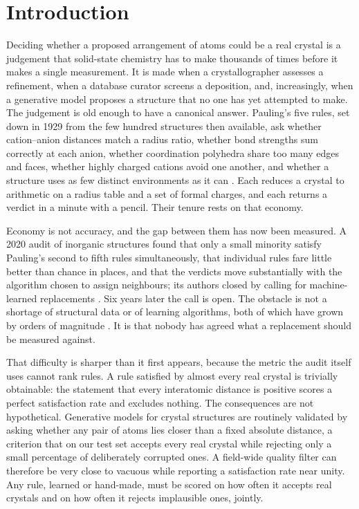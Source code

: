\section{Introduction}

Deciding whether a proposed arrangement of atoms could be a real crystal is a judgement
that solid-state chemistry has to make thousands of times before it makes a single
measurement. It is made when a crystallographer assesses a refinement, when a database
curator screens a deposition, and, increasingly, when a generative model proposes a
structure that no one has yet attempted to make. The judgement is old enough to have a
canonical answer. Pauling's five rules, set down in 1929 from the few hundred structures
then available, ask whether cation--anion distances match a radius ratio, whether bond
strengths sum correctly at each anion, whether coordination polyhedra share too many
edges and faces, whether highly charged cations avoid one another, and whether a
structure uses as few distinct environments as it can \cite{pauling1929principles}. Each
reduces a crystal to arithmetic on a radius table and a set of formal charges, and each
returns a verdict in a minute with a pencil. Their tenure rests on that economy.

Economy is not accuracy, and the gap between them has now been measured. A 2020 audit of
inorganic structures found that only a small minority satisfy Pauling's second to fifth
rules simultaneously, that individual rules fare little better than chance in places, and
that the verdicts move substantially with the algorithm chosen to assign neighbours; its
authors closed by calling for machine-learned replacements \cite{george2020limited}. Six
years later the call is open. The obstacle is not a shortage of structural data or of
learning algorithms, both of which have grown by orders of magnitude
\cite{jain2013commentary,shannon1976revised}. It is that nobody has agreed what a
replacement should be measured against.

That difficulty is sharper than it first appears, because the metric the audit itself
uses cannot rank rules. A rule satisfied by almost every real crystal is trivially
obtainable: the statement that every interatomic distance is positive scores a perfect
satisfaction rate and excludes nothing. The consequences are not hypothetical. Generative
models for crystal structures are routinely validated by asking whether any pair of atoms
lies closer than a fixed absolute distance, a criterion that on our test set accepts every
real crystal while rejecting only a small percentage of deliberately corrupted ones. A
field-wide quality filter can therefore be very close to vacuous while reporting a
satisfaction rate near unity. Any rule, learned or hand-made, must be scored on how often
it accepts real crystals and on how often it rejects implausible ones, jointly.

